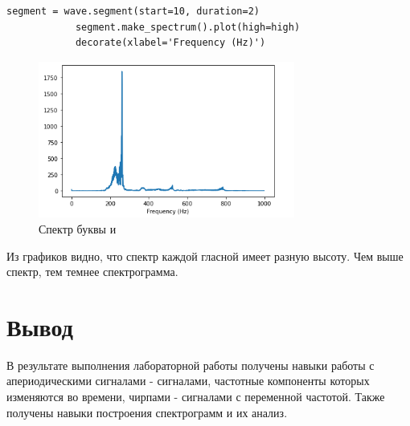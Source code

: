 \documentclass[a4paper,12pt]{article}
\begin{document}
\begin{enumerate}
		\begin{lstlisting}[caption=Спектр буквы и]
			segment = wave.segment(start=10, duration=2)
			segment.make_spectrum().plot(high=high)
			decorate(xlabel='Frequency (Hz)')
		\end{lstlisting}
		\begin{figure}[H]
			\centering
			\includegraphics[width=0.75\textwidth]{6_7.png}
			\caption{Спектр буквы и}
			\label{fig:6.7}
		\end{figure}
		
		
		Из графиков видно, что спектр каждой гласной имеет разную высоту. 
		Чем выше спектр, тем темнее спектрограмма.
		
		
	\end{enumerate}
	
	\newpage
	
	\section{Вывод}
	
	В результате выполнения лабораторной работы получены навыки работы с апериодическими сигналами - сигналами, частотные компоненты которых изменяются во времени, чирпами - сигналами с переменной частотой. Также получены навыки построения спектрограмм и их анализ.
	
\end{document}
